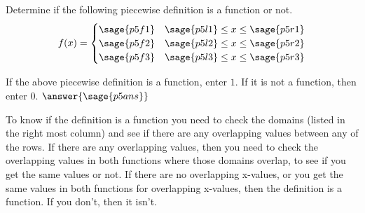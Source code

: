 \documentclass{ximera}
\begin{document}
\begin{problem}
    Determine if the following piecewise definition is a function or not. 
    \[
        f(x) =
            \begin{cases}
                \sage{p5f1}     & \sage{p5l1}\leq x \leq \sage{p5r1} \\
                \sage{p5f2}     & \sage{p5l2} \leq x \leq \sage{p5r2} \\
                \sage{p5f3}     & \sage{p5l3} \leq x \leq \sage{p5r3}
            \end{cases}
    \]
    
    If the above piecewise definition is a function, enter $1$. If it is not a function, then enter $0$.
    $\answer{\sage{p5ans}}$
    \begin{feedback}
        To know if the definition is a function you need to check the domains (listed in the right most column) and see if there are any overlapping values between any of the rows. If there are any overlapping values, then you need to check the overlapping values in both functions where those domains overlap, to see if you get the same values or not. If there are no overlapping x-values, or you get the same values in both functions for overlapping x-values, then the definition is a function. If you don't, then it isn't.
    \end{feedback}
    
\end{problem}
\end{document}
